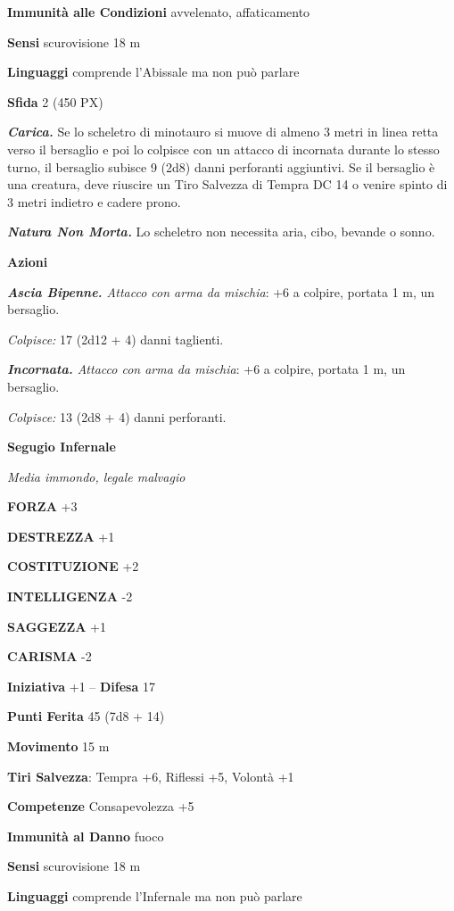 \begin{multicols}{2}
	\textbf{Immunità alle Condizioni} avvelenato, affaticamento

	\textbf{Sensi} scurovisione 18 m

	\textbf{Linguaggi} comprende l'Abissale ma non può parlare

	\textbf{Sfida} 2 (450 PX)

	\textit{\textbf{Carica.}} Se lo scheletro di minotauro si muove di almeno 3 metri in linea retta verso il bersaglio e poi lo colpisce con un attacco di incornata durante lo stesso turno, il bersaglio subisce 9 (2d8) danni perforanti aggiuntivi. Se il bersaglio è una creatura, deve riuscire un Tiro Salvezza di Tempra DC 14 o venire spinto di 3 metri indietro e cadere prono.

	\textit{\textbf{Natura Non Morta.}} Lo scheletro non necessita aria, cibo, bevande o sonno.

	\textbf{Azioni}

	\textit{\textbf{Ascia Bipenne.} Attacco con arma da mischia}: +6 a colpire, portata 1 m, un bersaglio.

	\textit{Colpisce:} 17 (2d12 + 4) danni taglienti.

	\textit{\textbf{Incornata.} Attacco con arma da mischia}: +6 a colpire, portata 1 m, un bersaglio.

	\textit{Colpisce:} 13 (2d8 + 4) danni perforanti.

	\medskip{}\textbf{Segugio Infernale}

	\textit{Media immondo, legale malvagio}

	\textbf{FORZA} +3

	\textbf{DESTREZZA} +1

	\textbf{COSTITUZIONE} +2

	\textbf{INTELLIGENZA} -2

	\textbf{SAGGEZZA} +1

	\textbf{CARISMA} -2

	\textbf{Iniziativa} +1 -- \textbf{Difesa} 17

	\textbf{Punti Ferita} 45 (7d8 + 14)

	\textbf{Movimento} 15 m

	\textbf{Tiri Salvezza}: Tempra +6, Riflessi +5, Volontà +1

	\textbf{Competenze} Consapevolezza +5

	\textbf{Immunità al Danno} fuoco

	\textbf{Sensi} scurovisione 18 m

	\textbf{Linguaggi} comprende l'Infernale ma non può parlare


\end{multicols}
